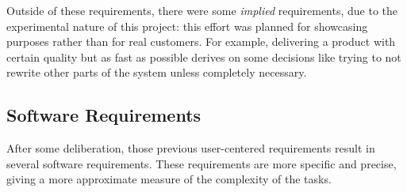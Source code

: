 Outside of these requirements, there were some \emph{implied} requirements, due to the experimental nature of this project: this effort was planned for showcasing purposes rather than for real customers.
For example, delivering a product with certain quality but as fast as possible derives on some decisions like trying to not rewrite other parts of the system unless completely necessary.


\subsection{Software Requirements} %
\label{sub:software_requirements}

After some deliberation, those previous user-centered requirements result in several software requirements.
These requirements are more specific and precise, giving a more approximate measure of the complexity of the tasks.

\begin{center}
  \begin{softwarerequirement}
    \label{tab:requirementapplet}%
  \end{softwarerequirement}
\end{center}


